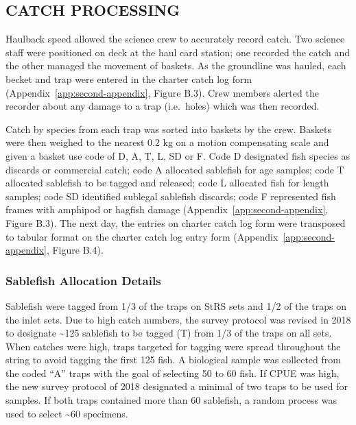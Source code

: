 \documentclass[12pt]{article}\usepackage[]{graphicx}\usepackage[]{color}
\begin{document}
\hypertarget{catch-processing}{%
\subsection{CATCH PROCESSING}\label{catch-processing}}

Haulback speed allowed the science crew to accurately record catch. Two science staff were positioned on deck at the haul card station; one recorded the catch and the other managed the movement of baskets. As the groundline was hauled, each becket and trap were entered in the charter catch log form (Appendix~\ref{app:second-appendix}, Figure B.3). Crew members alerted the recorder about any damage to a trap (i.e.~holes) which was then recorded.

Catch by species from each trap was sorted into baskets by the crew. Baskets were then weighed to the nearest 0.2 kg on a motion compensating scale and given a basket use code of D, A, T, L, SD or F. Code D designated fish species as discards or commercial catch; code A allocated sablefish for age samples; code T allocated sablefish to be tagged and released; code L allocated fish for length samples; code SD identified sublegal sablefish discards; code F represented fish frames with amphipod or hagfish damage (Appendix~\ref{app:second-appendix}, Figure B.3). The next day, the entries on charter catch log form were transposed to tabular format on the charter catch log entry form (Appendix~\ref{app:second-appendix}, Figure B.4).

\hypertarget{sablefish-allocation-details}{%
\subsubsection{Sablefish Allocation Details}\label{sablefish-allocation-details}}

Sablefish were tagged from 1/3 of the traps on StRS sets and 1/2 of the traps on the inlet sets. Due to high catch numbers, the survey protocol was revised in 2018 to designate \textasciitilde125 sablefish to be tagged (T) from 1/3 of the traps on all sets. When catches were high, traps targeted for tagging were spread throughout the string to avoid tagging the first 125 fish. A biological sample was collected from the coded ``A'' traps with the goal of selecting 50 to 60 fish. If CPUE was high, the new survey protocol of 2018 designated a minimal of two traps to be used for samples. If both traps contained more than 60 sablefish, a random process was used to select \textasciitilde60 specimens.
\end{document}
